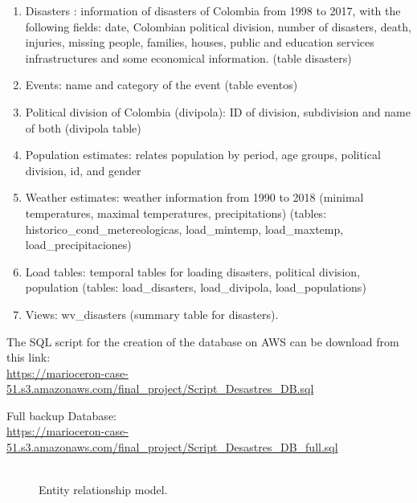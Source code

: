 \begin{enumerate}

\item Disasters : information of disasters of Colombia from 1998 to 2017, with the following fields: date,  Colombian political division, number of disasters, death, injuries, missing people, families, houses, public and education services infrastructures and some economical  information. (table disasters)
\item Events: name and category of the event (table eventos)
 
\item Political division of Colombia (divipola): ID of division, subdivision and name of both (divipola table)

\item Population estimates: relates population by period, age groups, political division, id, and gender

\item Weather estimates:  weather information from 1990 to 2018 (minimal temperatures, maximal temperatures, precipitations) (tables: historico\_cond\_metereologicas, load\_mintemp, load\_maxtemp, load\_precipitaciones)	


\item Load tables: temporal tables for loading disasters, political division, population (tables: load\_disasters, load\_divipola, load\_populations)

\item Views: wv\_disasters (summary table for disasters). 

\end{enumerate}

The SQL script for the creation of the database on AWS can be download from this link: \\ \url{https://marioceron-case-51.s3.amazonaws.com/final_project/Script_Desastres_DB.sql}{}

Full backup Database: \\ 
\url{https://marioceron-case-51.s3.amazonaws.com/final_project/Script_Desastres_DB_full.sql}{} \\ \\ 


 
\begin{figure}[!htb]
\caption{Entity relationship model.}
\label{fig:er_model}
\end{figure}

